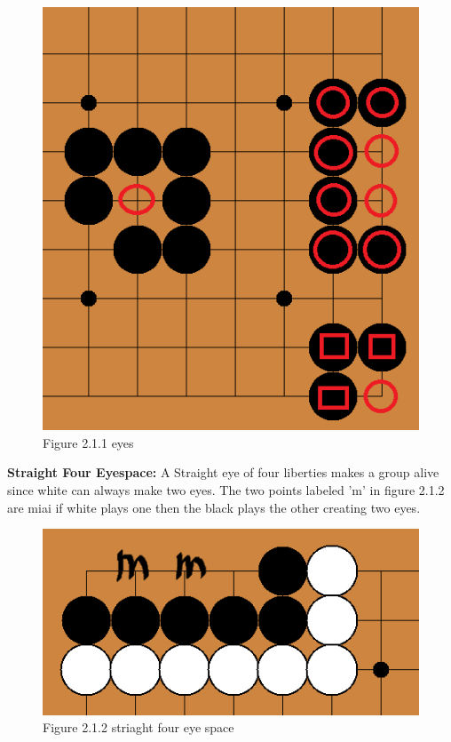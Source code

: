 \documentclass{l3proj}
\begin{document}
\begin{figure}[H]
\centering
\includegraphics[scale=0.5]{Images/eyes.png}
\caption{Figure 2.1.1 eyes}
\end{figure}

\textbf{Straight Four Eyespace:} A Straight eye of four liberties makes a group alive since white can always make two eyes. The two points labeled 'm' in figure 2.1.2 are miai if white plays one then the black plays the other creating two eyes.

\begin{figure}[H]
\centering
\includegraphics[scale=0.5]{Images/foureyespace.png}
\caption{Figure 2.1.2 striaght four eye space}
\end{figure}
\end{document}
